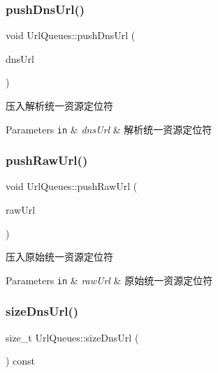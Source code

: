\subsubsection{\texorpdfstring{push\+Dns\+Url()}{pushDnsUrl()}}
{\footnotesize\ttfamily void Url\+Queues\+::push\+Dns\+Url (\begin{DoxyParamCaption}\item[{\hyperlink{class_dns_url}{Dns\+Url} const \&}]{dns\+Url }\end{DoxyParamCaption})}



压入解析统一资源定位符 


\begin{DoxyParams}[1]{Parameters}
\mbox{\tt in}  & {\em dns\+Url} & 解析统一资源定位符 \\
\hline
\end{DoxyParams}
\mbox{\label{class_url_queues_a9649c30b72bdb4092732e505e4041e83}} 
\subsubsection{\texorpdfstring{push\+Raw\+Url()}{pushRawUrl()}}
{\footnotesize\ttfamily void Url\+Queues\+::push\+Raw\+Url (\begin{DoxyParamCaption}\item[{\hyperlink{class_raw_url}{Raw\+Url} const \&}]{raw\+Url }\end{DoxyParamCaption})}



压入原始统一资源定位符 


\begin{DoxyParams}[1]{Parameters}
\mbox{\tt in}  & {\em raw\+Url} & 原始统一资源定位符 \\
\hline
\end{DoxyParams}
\mbox{\label{class_url_queues_a65b094e4cd9f54ce9019b4045dd0e6da}} 
\subsubsection{\texorpdfstring{size\+Dns\+Url()}{sizeDnsUrl()}}
{\footnotesize\ttfamily size\+\_\+t Url\+Queues\+::size\+Dns\+Url (\begin{DoxyParamCaption}\item[{void}]{ }\end{DoxyParamCaption}) const}



